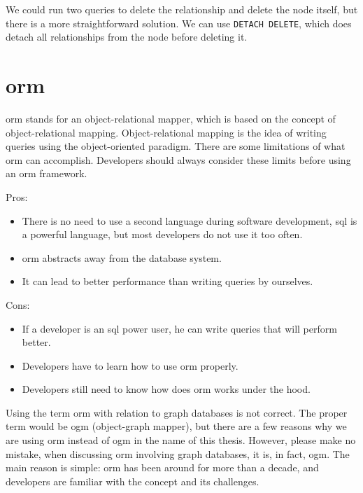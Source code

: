 We could run two queries to delete the relationship and delete the node itself, but there is a more straightforward solution.
We can use \texttt{DETACH DELETE}, which does detach all relationships from the node before deleting it.

\section{\acrshort{orm}}
\acrshort{orm} stands for an object-relational mapper, which is based on the concept of object-relational mapping.
Object-relational mapping is the idea of writing queries using the object-oriented paradigm.
There are some limitations of what \acrshort{orm} can accomplish. Developers should always consider these limits before using an \acrshort{orm} framework. \cite{mario_hoyos_what_2018}

\noindent Pros:
\begin{itemize}
    \item There is no need to use a second language during software development, \acrshort{sql} is a powerful language, but most developers do not use it too often.
    \item \acrshort{orm} abstracts away from the database system.
    \item It can lead to better performance than writing queries by ourselves.
\end{itemize}
Cons:
\begin{itemize}
    \item If a developer is an \acrshort{sql} power user, he can write queries that will perform better.
    \item Developers have to learn how to use \acrshort{orm} properly.
    \item Developers still need to know how does \acrshort{orm} works under the hood.
\end{itemize}

Using the term \acrshort{orm} with relation to graph databases is not correct. The proper term would be \acrshort{ogm} (object-graph mapper),
but there are a few reasons why we are using \acrshort{orm} instead of \acrshort{ogm} in the name of this thesis. However, please make no mistake,
when discussing \acrshort{orm} involving graph databases, it is, in fact, \acrshort{ogm}.
The main reason is simple: \acrshort{orm} has been around for more than a decade, and developers are familiar with the concept and its challenges.
